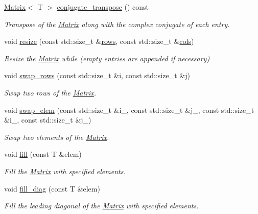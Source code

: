 \begin{DoxyCompactItemize}
\hyperlink{classLuna_1_1Matrix}{Matrix}$<$ T $>$ \hyperlink{classLuna_1_1Matrix_ae2b183ce0d818f9467e12754873ed391}{conjugate\+\_\+transpose} () const
\begin{DoxyCompactList}\small\item\em Transpose of the \hyperlink{classLuna_1_1Matrix}{Matrix} along with the complex conjugate of each entry. \end{DoxyCompactList}\item 
void \hyperlink{classLuna_1_1Matrix_a79c2f771fced9043429c72c155f8486c}{resize} (const std\+::size\+\_\+t \&\hyperlink{classLuna_1_1Matrix_ae7b0b30c3e22ba252d660f093757295e}{rows}, const std\+::size\+\_\+t \&\hyperlink{classLuna_1_1Matrix_aa7472f90f4c470535e722f3a389a19b1}{cols})
\begin{DoxyCompactList}\small\item\em Resize the \hyperlink{classLuna_1_1Matrix}{Matrix} while (empty entries are appended if necessary) \end{DoxyCompactList}\item 
void \hyperlink{classLuna_1_1Matrix_a46e8cc3ae348fe42c6e7e41502fc10a0}{swap\+\_\+rows} (const std\+::size\+\_\+t \&i, const std\+::size\+\_\+t \&j)
\begin{DoxyCompactList}\small\item\em Swap two rows of the \hyperlink{classLuna_1_1Matrix}{Matrix}. \end{DoxyCompactList}\item 
void \hyperlink{classLuna_1_1Matrix_a728f479ceacf5f2d9e7b2d72baf1c798}{swap\+\_\+elem} (const std\+::size\+\_\+t \&i\+\_, const std\+::size\+\_\+t \&j\+\_, const std\+::size\+\_\+t \&i\+\_, const std\+::size\+\_\+t \&j\+\_)
\begin{DoxyCompactList}\small\item\em Swap two elements of the \hyperlink{classLuna_1_1Matrix}{Matrix}. \end{DoxyCompactList}\item 
void \hyperlink{classLuna_1_1Matrix_ad6e6dbb7290a74bda17629dc5440328d}{fill} (const T \&elem)
\begin{DoxyCompactList}\small\item\em Fill the \hyperlink{classLuna_1_1Matrix}{Matrix} with specified elements. \end{DoxyCompactList}\item 
void \hyperlink{classLuna_1_1Matrix_a0e75d89d4a7a85d403922f4b7fac623d}{fill\+\_\+diag} (const T \&elem)
\begin{DoxyCompactList}\small\item\em Fill the leading diagonal of the \hyperlink{classLuna_1_1Matrix}{Matrix} with specified elements. \end{DoxyCompactList}\item 

\end{DoxyCompactItemize}
